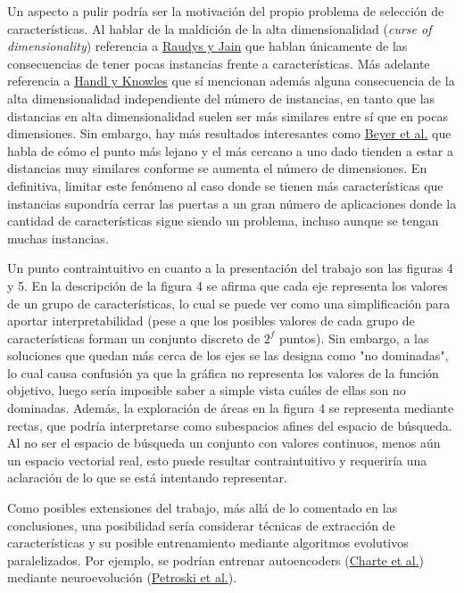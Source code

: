 \documentclass{article}
\begin{document}
Un aspecto a pulir podría ser la motivación del propio problema de selección de características. Al hablar de la maldición de la alta dimensionalidad (\emph{curse of dimensionality}) referencia a \href{http://web.cse.msu.edu/prip/ResearchProjects/cluster_research/papers/RaudysJainPAMI91.pdf}{Raudys y Jain} que hablan únicamente de las consecuencias de tener pocas instancias frente a características. Más adelante referencia a \href{https://www.researchgate.net/publication/228670597_Feature_Subset_Selection_in_Unsupervised_Learning_via_Multiobjective_Optimization}{Handl y Knowles} que sí mencionan además alguna consecuencia de la alta dimensionalidad independiente del número de instancias, en tanto que las distancias en alta dimensionalidad suelen ser más similares entre sí que en pocas dimensiones. Sin embargo, hay más resultados interesantes como \href{https://link.springer.com/chapter/10.1007/3-540-49257-7_15}{Beyer et al.} que habla de cómo el punto más lejano y el más cercano a uno dado tienden a estar a distancias muy similares conforme se aumenta el número de dimensiones. En definitiva, limitar este fenómeno al caso donde se tienen más características que instancias supondría cerrar las puertas a un gran número de aplicaciones donde la cantidad de características sigue siendo un problema, incluso aunque se tengan muchas instancias.

Un punto contraintuitivo en cuanto a la presentación del trabajo son las figuras 4 y 5. En la descripción de la figura 4 se afirma que cada eje representa los valores de un grupo de características, lo cual se puede ver como una simplificación para aportar interpretabilidad (pese a que los posibles valores de cada grupo de características forman un conjunto discreto de $2^f$ puntos). Sin embargo, a las soluciones que quedan más cerca de los ejes se las designa como "no dominadas", lo cual causa confusión ya que la gráfica no representa los valores de la función objetivo, luego sería imposible saber a simple vista cuáles de ellas son no dominadas. Además, la exploración de áreas en la figura 4 se representa mediante rectas, que podría interpretarse como subespacios afines del espacio de búsqueda. Al no ser el espacio de búsqueda un conjunto con valores continuos, menos aún un espacio vectorial real, esto puede resultar contraintuitivo y requeriría una aclaración de lo que se está intentando representar.

Como posibles extensiones del trabajo, más allá de lo comentado en las conclusiones, una posibilidad sería considerar técnicas de extracción de características y su posible entrenamiento mediante algoritmos evolutivos paralelizados. Por ejemplo, se podrían entrenar autoencoders (\href{https://arxiv.org/abs/1801.01586}{Charte et al.}) mediante neuroevolución (\href{https://arxiv.org/abs/1712.06567}{Petroski et al.}).
\end{document}

